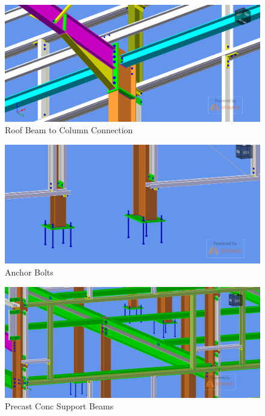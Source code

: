 \begin{figure}
	\centering
	\includegraphics[width=1.0\linewidth]{a3img/4.png}
	\caption{Roof Beam to Column Connection}
	\label{fig:ass3img4}
\end{figure}

\begin{figure}
	\centering
	\includegraphics[width=1.0\linewidth]{a3img/5.png}
	\caption{Anchor Bolts}
	\label{fig:ass3img5}
\end{figure}

\begin{figure}
	\centering
	\includegraphics[width=1.0\linewidth]{a3img/6.png}
	\caption{Precast Conc Support Beams}
	\label{fig:ass3img6}
\end{figure}

